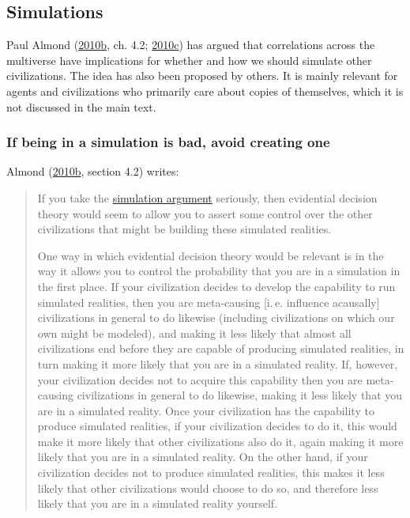 \hypertarget{simulations}{\subsection{Simulations}\label{simulations}}

Paul Almond
(\href{https://web.archive.org/web/20120310010225/http://www.paul-almond.com/Correlation2.pdf}{2010b},
ch. 4.2;
\href{https://www.researchgate.net/publication/265224117_Can_you_retroactively_put_yourself_in_a_computer_simulation}{2010c})
has argued that correlations across the multiverse have implications for
whether and how we should simulate other civilizations. The idea has
also been proposed by others. It is mainly relevant for agents and
civilizations who primarily care about copies of themselves, which it is
not discussed in the main text.

\subsubsection{If being in a simulation is bad, avoid creating
one}\label{if-being-in-a-simulation-is-bad-avoid-creating-one}

Almond
(\href{https://web.archive.org/web/20120310010225/http://www.paul-almond.com/Correlation2.pdf}{2010b},
section 4.2) writes:

\begin{quote}
If you take the
\href{http://www.simulation-argument.com/}{simulation argument}
seriously, then evidential decision theory would seem to allow you to
assert some control over the other civilizations that might be building
these simulated realities.

One way in which evidential decision theory would be relevant is in the
way it allows you to control the probability that you are in a
simulation in the first place. If your civilization decides to develop
the capability to run simulated realities, then you are meta-causing
{[}i.\,e. influence acausally{]} civilizations in general to do likewise
(including civilizations on which our own might be modeled), and making
it less likely that almost all civilizations end before they are capable
of producing simulated realities, in turn making it more likely that you
are in a simulated reality. If, however, your civilization decides not
to acquire this capability then you are meta-causing civilizations in
general to do likewise, making it less likely that you are in a
simulated reality. Once your civilization has the capability to produce
simulated realities, if your civilization decides to do it, this would
make it more likely that other civilizations also do it, again making it
more likely that you are in a simulated reality. On the other hand, if
your civilization decides not to produce simulated realities, this makes
it less likely that other civilizations would choose to do so, and
therefore less likely that you are in a simulated reality yourself.
\end{quote}

